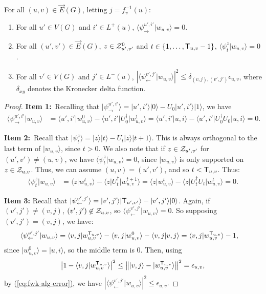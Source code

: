 \documentclass{article}
\newcommand{\eq}[1]{\hyperref[eq:#1]{(\ref*{eq:#1})}}
\def\ket#1{{\lvert}#1\rangle}
\def\bra#1{{\langle}#1\rvert}
\renewcommand{\>}{\rangle}
\newcommand{\<}{\langle}
\renewcommand{\(}{\left(}
\renewcommand{\)}{\right)}
\def\braket#1#2{{{\langle}#1\vert}#2\rangle}
\def\abs#1{\left| #1 \right|}
\def\norm#1{\left\| #1 \right\|}
\begin{document}
\begin{claim}\label{clm:ortho1}
For all $(u,v)\in \overrightarrow{E}(G)$, letting $j=f_v^{-1}(u)$:
\begin{enumerate}
\item For all $u'\in V(G)$ and $i'\in L^+(u)$, $\braket{\psi_{\rightarrow}^{u',i'}}{w_{u,v}}=0$.
\item For all $(u',v')\in \overrightarrow{E}(G)$, $z\in{\cal Z}_{u',v'}^0$ and $t\in \{1,\dots,{\sf T}_{u,v}-1\}$, $\braket{\psi_t^{z}}{w_{u,v}}=0$. 
\item For all $v'\in V(G)$ and $j'\in L^-(u)$, 
$|\braket{\psi_{\leftarrow}^{v',j'}}{w_{u,v}}|^2\leq
\delta_{(v,j),(v',j')}{\epsilon_{u,v}}$, where $\delta_{xy}$ denotes the Kronecker delta function.
\end{enumerate}
\end{claim}
\begin{proof}
\textbf{Item 1:}~Recalling that $\ket{\psi_{\rightarrow}^{u',i'}}=\ket{u',i'}\ket{0}-U_0\ket{u',i'}\ket{1}$, we have
\begin{align*}
\braket{\psi_{\rightarrow}^{u',i'}}{w_{u,v}} &= \braket{u',i'}{w_{u,v}^0} - \bra{u',i'}U_0^\dagger\ket{w_{u,v}^{1}}
= \braket{u',i'}{u,i} - \bra{u',i'}U_0^\dagger U_0\ket{u,i} = 0.
\end{align*}



\noindent\textbf{Item 2:}~Recall that $\ket{\psi_{t}^z}=\ket{z}\ket{t}-U_t\ket{z}\ket{t+1}$. This is always orthogonal to the last term of $\ket{w_{u,v}}$, since $t>0$. We also note that if $z\in {\cal Z}_{u',v'}$ for $(u',v')\neq (u,v)$, we have $\braket{\psi_t^z}{w_{u,v}}=0$, since $\ket{w_{u,v}}$ is only supported on $z\in{\cal Z}_{u,v}$. Thus, we can assume $(u,v)=(u',v')$, and so $t<{\sf T}_{u,v}$. Thus:
\begin{align*}
\braket{\psi_t^z}{w_{u,v}} &= \braket{z}{w_{u,v}^t} - \bra{z}U_t^\dagger\ket{w_{u,v}^{t+1}}
= \braket{z}{w_{u,v}^t} - \bra{z}U_t^\dagger U_t\ket{w_{u,v}^{t}} = 0.
\end{align*}

\noindent\textbf{Item 3:} Recall that $\ket{\psi_{\leftarrow}^{v',j'}}=\ket{v',j'}\ket{{\sf T}_{u',v'}}-\ket{v',j'}\ket{0}$. Again, if $(v',j')\neq (v,j)$, $(v',j')\not\in {\cal Z}_{u,v}$, so $\braket{\psi_{\leftarrow}^{v',j'}}{w_{u,v}}=0$. So supposing $(v',j')=(v,j)$, we have:
\begin{align*}
\braket{\psi_{\leftarrow}^{v',j'}}{w_{u,v}} &=  \braket{v,j}{w_{u,v}^{{\sf T}_{u,v}}}-\braket{v,j}{w_{u,v}^0}
-\braket{v,j}{v,j}
= \braket{v,j}{w_{u,v}^{{\sf T}_{u,v}}}-1,
\end{align*}
since $\ket{w_{u,v}^0}=\ket{u,i}$, so the middle term is 0. Then, using 
$$\abs{1-\braket{v,j}{w_{u,v}^{{\sf T}_{u,v}}}}^2\leq\norm{\ket{v,j}-\ket{w_{u,v}^{{\sf T}_{u,v}}}}^2= {\epsilon_{u,v}},$$
by \eq{fwk-alg-error}, 
we have
$|\braket{\psi_{\leftarrow}^{v',j'}}{w_{u,v}}|^2\leq {\epsilon_{u,v}}.$
\end{proof}
\end{document}
